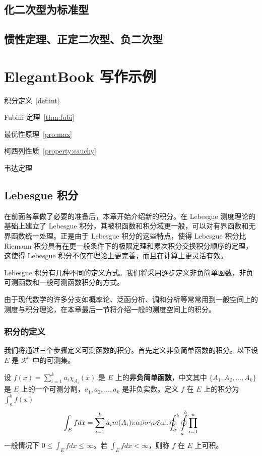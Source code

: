 \documentclass[lang=cn,10pt]{elegantbook}
\begin{document}
\section{化二次型为标准型}
\section{惯性定理、正定二次型、负二次型}

\chapter{ElegantBook 写作示例}

\begin{introduction}
  \item 积分定义~\ref{def:int}
  \item Fubini 定理~\ref{thm:fubi}
  \item 最优性原理~\ref{pro:max}
  \item 柯西列性质~\ref{property:cauchy}
  \item 韦达定理
\end{introduction}

\section{Lebesgue 积分}
在前面各章做了必要的准备后，本章开始介绍新的积分。在 Lebesgue 测度理论的基础上建立了 Lebesgue 积分，其被积函数和积分域更一般，可以对有界函数和无界函数统一处理。正是由于 Lebesgue 积分的这些特点，使得 Lebesgue 积分比 Riemann 积分具有在更一般条件下的极限定理和累次积分交换积分顺序的定理，这使得 Lebesgue 积分不仅在理论上更完善，而且在计算上更灵活有效。

Lebesgue 积分有几种不同的定义方式。我们将采用逐步定义非负简单函数，非负可测函数和一般可测函数积分的方式。

由于现代数学的许多分支如概率论、泛函分析、调和分析等常常用到一般空间上的测度与积分理论，在本章最后一节将介绍一般的测度空间上的积分。

\subsection{积分的定义}

我们将通过三个步骤定义可测函数的积分。首先定义非负简单函数的积分。以下设 $E$ 是 $\mathcal{R}^n$ 中的可测集。

\begin{definition}[可积性] \label{def:int} 
设 $ f(x)=\sum\limits_{i=1}^{k} a_i \chi_{A_i}(x)$ 是 $E$ 上的\textbf{非负简单函数}，中文其中 $\{A_1,A_2,\ldots,A_k\}$ 是 $E$ 上的一个可测分割，$a_1,a_2,\ldots,a_k$ 是非负实数。定义 $f$ 在 $E$ 上的积分为 $\int_{a}^b f(x)$
\begin{equation}
   \label{inter}
   \int_{E} f dx = \sum_{i=1}^k a_i m(A_i) \pi \alpha\beta\sigma\gamma\nu\xi\epsilon\varepsilon. \oint_{a}^b\ointop_{a}^b\prod_{i=1}^n
\end{equation}
一般情况下 $0 \leq \int_{E} f dx \leq \infty$。若 $\int_{E} f dx < \infty$，则称 $f$ 在 $E$ 上可积。
\end{definition}
\end{document}
